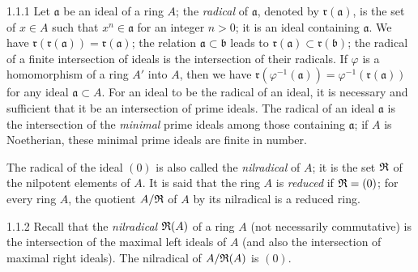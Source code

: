 
\begin{env}{1.1.1}
\label{env-0.1.1.1}
Let $\mathfrak{a}$ be an ideal of a ring $A$; the \emph{radical} of $\mathfrak{a}$, denoted
by $\mathfrak{r}(\mathfrak{a})$, is the set of $x\in A$ such that $x^n\in\mathfrak{a}$ for
an integer $n>0$; it is an ideal containing $\mathfrak{a}$. We have
$\mathfrak{r}(\mathfrak{r}(\mathfrak{a}))=\mathfrak{r}(\mathfrak{a})$; the relation
$\mathfrak{a}\subset\mathfrak{b}$ leads to $\mathfrak{r}(\mathfrak{a})\subset\mathfrak{r}(\mathfrak{b})$;
the radical of a finite intersection of ideals is the intersection of their radicals. If $\varphi$
is a homomorphism of a ring $A'$ into $A$, then we have
$\mathfrak{r}(\varphi^{-1}(\mathfrak{a}))=\varphi^{-1}(\mathfrak{r}(\mathfrak{a}))$
for any ideal $\mathfrak{a}\subset A$. For an ideal to be the radical of an ideal,
it is necessary and sufficient that it be an intersection of prime ideals. The radical of an
ideal $\mathfrak{a}$ is the intersection of the
\emph{minimal} prime ideals among those containing $\mathfrak{a}$; if $A$ is
Noetherian, these minimal prime ideals are finite in number.

The radical of the ideal $(0)$ is also called the \emph{nilradical} of $A$; it is the set
$\mathfrak{R}$ of the nilpotent elements of $A$. It is said that the ring $A$ is \emph{reduced} if
$\mathfrak{R}=(0)$; for every ring $A$, the quotient $A/\mathfrak{R}$ of $A$ by its nilradical is a
reduced ring.
\end{env}

\begin{env}{1.1.2}
\label{env-0.1.1.2}
Recall that the \emph{nilradical} $\mathfrak{R}(A)$ of a ring $A$ (not necessarily commutative) is the
intersection of the maximal left ideals of $A$ (and also the intersection of maximal
right ideals). The nilradical of $A/\mathfrak{R}(A)$ is $(0)$.
\end{env}

